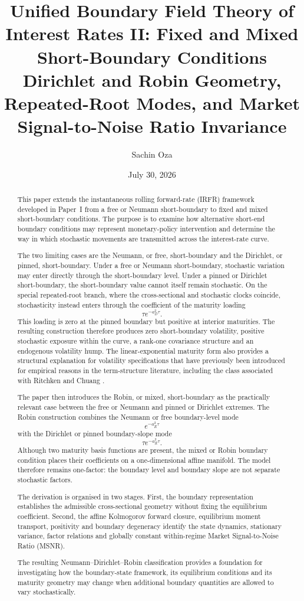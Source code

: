 \documentclass[12pt]{article}
\title{\textbf{Unified Boundary Field Theory of Interest Rates II: Fixed and Mixed Short-Boundary Conditions}\\[0.55em]
\large Dirichlet and Robin Geometry, Repeated-Root Modes, and Market Signal-to-Noise Ratio Invariance}
\author{Sachin Oza}
\date{July 30, 2026}
\numberwithin{equation}{subsection}
\begin{document}
\maketitle

\begin{abstract}
This paper extends the instantaneous rolling forward-rate (IRFR) framework developed in Paper~I \cite{Oza2026} from a free or Neumann short-boundary to fixed and mixed short-boundary conditions. The purpose is to examine how alternative short-end boundary conditions may represent monetary-policy intervention and determine the way in which stochastic movements are transmitted across the interest-rate curve.

The two limiting cases are the Neumann, or free, short-boundary and the Dirichlet, or pinned, short-boundary. Under a free or Neumann short-boundary, stochastic variation may enter directly through the short-boundary level. Under a pinned or Dirichlet short-boundary, the short-boundary value cannot itself remain stochastic. On the special repeated-root branch, where the cross-sectional and stochastic clocks coincide, stochasticity instead enters through the coefficient of the maturity loading
\[
\tau e^{-a_D^2\tau}.
\]
This loading is zero at the pinned boundary but positive at interior maturities. The resulting construction therefore produces zero short-boundary volatility, positive stochastic exposure within the curve, a rank-one covariance structure and an endogenous volatility hump. The linear-exponential maturity form also provides a structural explanation for volatility specifications that have previously been introduced for empirical reasons in the term-structure literature, including the class associated with Ritchken and Chuang \cite{RitchkenChuang1999}.

The paper then introduces the Robin, or mixed, short-boundary as the practically relevant case between the free or Neumann and pinned or Dirichlet extremes. The Robin construction combines the Neumann or free boundary-level mode
\[
e^{-a_R^2\tau}
\]
with the Dirichlet or pinned boundary-slope mode
\[
\tau e^{-a_R^2\tau}.
\]
Although two maturity basis functions are present, the mixed or Robin boundary condition places their coefficients on a one-dimensional affine manifold. The model therefore remains one-factor: the boundary level and boundary slope are not separate stochastic factors.

The derivation is organised in two stages. First, the boundary representation establishes the admissible cross-sectional geometry without fixing the equilibrium coefficient. Second, the affine Kolmogorov forward closure, equilibrium moment transport, positivity and boundary degeneracy identify the state dynamics, stationary variance, factor relations and globally constant within-regime Market Signal-to-Noise Ratio (MSNR).

The resulting Neumann--Dirichlet--Robin classification provides a foundation for investigating how the boundary-state framework, its equilibrium conditions and its maturity geometry may change when additional boundary quantities are allowed to vary stochastically.

\end{abstract}
\end{document}
